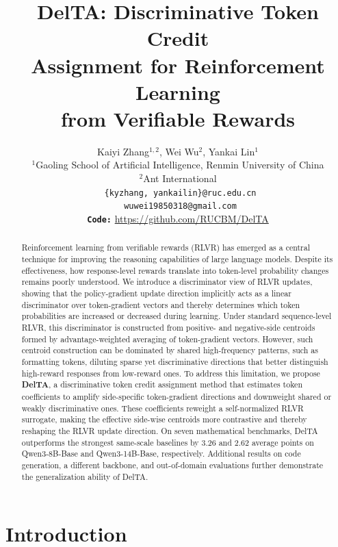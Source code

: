 \documentclass{article} %
\title{DelTA: Discriminative Token Credit \\ Assignment for Reinforcement Learning \\ from Verifiable Rewards}
\author{
  Kaiyi Zhang$^{1,2}$\hspace{0.4em}, \hspace{0.1em} Wei Wu$^{2}$\footnotemark[2]\hspace{0.4em}, \hspace{0.1em} Yankai Lin$^{1}$\footnotemark[2]\hspace{0.3em}\\
  $^{1}$Gaoling School of Artificial Intelligence, Renmin University of China \\ $^{2}$Ant International\\
  \Letter~\texttt{\{kyzhang, yankailin\}@ruc.edu.cn}\\
  \Letter~\texttt{wuwei19850318@gmail.com}  \\
  {\small \github \texttt{\textbf{Code:}} \url{https://github.com/RUCBM/DelTA}}\\
}
\begin{document}
\renewcommand{\thefootnote}{\fnsymbol{footnote}}

\renewcommand{\thefootnote}{\arabic{footnote}}
\setcounter{footnote}{0}
\newcommand{\Eq}[1]{Eq.~(\ref{#1})}

\maketitle
\begin{abstract}
Reinforcement learning from verifiable rewards (RLVR) has emerged as a central technique for improving the reasoning capabilities of large language models. 
Despite its effectiveness, how response-level rewards translate into token-level probability changes remains poorly understood. 
We introduce a discriminator view of RLVR updates, showing that the policy-gradient update direction implicitly acts as a linear discriminator over token-gradient vectors and thereby determines which token probabilities are increased or decreased during learning. 
Under standard sequence-level RLVR, this discriminator is constructed from positive- and negative-side centroids formed by advantage-weighted averaging of token-gradient vectors. 
However, such centroid construction can be dominated by shared high-frequency patterns, such as formatting tokens, diluting sparse yet discriminative directions that better distinguish high-reward responses from low-reward ones.
To address this limitation, we propose \textbf{DelTA}, a discriminative token credit assignment method that estimates token coefficients to amplify side-specific token-gradient directions and downweight shared or weakly discriminative ones. These coefficients reweight a self-normalized RLVR surrogate, making the effective side-wise centroids more contrastive and thereby reshaping the RLVR update direction. 
On seven mathematical benchmarks, DelTA outperforms the strongest same-scale baselines by 3.26 and 2.62 average points on Qwen3-8B-Base and Qwen3-14B-Base, respectively. 
Additional results on code generation, a different backbone, and out-of-domain evaluations further demonstrate the generalization ability of DelTA.
\end{abstract}

\section{Introduction}
\end{document}
